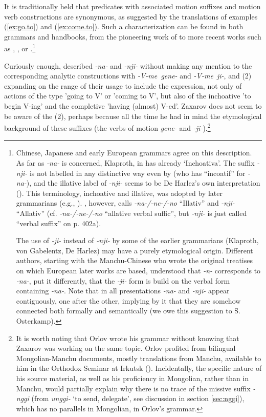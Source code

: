 \documentclass{article}
\newcommand{\ipa}[1]{\textit{{\phon\mbox{#1}}}} %
\begin{document}
It is traditionally held that predicates with associated motion suffixes and motion verb constructions are synonymous, as suggested by the translations of examples (\ref{ex:go.to}) and (\ref{ex:come.to}). Such a characterization can be found in both grammars and handbooks, from the pioneering work of \citet[163-165 §§133-134]{zaxarov10manchu} to more recent works such as \citet[34-35]{pashkov63manchu}, \citet[173-174]{avrorin00manchu},  \citet[19]{li00manchu} or \citet[239-240]{gorelova02manchu}.\footnote{Chinese, Japanese and early European grammars agree on this description. As far as \ipa{-na-} is concerned, Klaproth, in \citet[206]{adelung1817mithr} has already `Inchoativa'. The suffix \ipa{-nji-} is not labelled in any distinctive way even by \citet[51]{gabelentz32mandchou} (who has “incoatif” for \ipa{-na-}), and the illative label of \ipa{-nji-} seems to be De Harlez’s own interpretation (\citealt[51]{harlez84mandchou}). This terminology, inchoative and illative, was adopted by later grammarians  (e.g., \citet[367]{peeters40manjurische}). \citet[53]{haenisch61mandschu}, however, calls \ipa{-na-/-ne-/-no} “Illativ” and \ipa{-nji-} “Allativ” (cf. \citet[401b]{li00manchu} \ipa{-na-/-ne-/-no} “allative verbal suffic”, but \ipa{-nji-} is just called “verbal suffix” on p. 402a).

The use of \ipa{-ji-} instead of \ipa{-nji-} by some of the earlier grammarians (Klaproth, von Gabelentz, De Harlez) may have a purely etymological origin. Different authors, starting with the Manchu-Chinese who wrote the original treatises on which European later works are based, understood that \ipa{-n-} corresponds to \ipa{-na-}, put it differently, that the \ipa{-ji-} form is build on the verbal form containing \ipa{-na-}. Note that in all presentations \ipa{-na-} and \ipa{-nji-} appear contiguously, one after the other, implying by it that they are somehow connected both formally and semantically (we owe this suggestion to S. Osterkamp).}

Curiously enough, \citet{orlov1873manchu} described \ipa{-na-} and \ipa{-nji-} without making any mention to the corresponding analytic constructions with \ipa{-V-me gene-} and \ipa{-V-me ji-}, and (2) expanding on the range of their usage to include the expression, not only of actions of the type 'going to V' or 'coming to V', but also of the inchoative 'to begin V-ing' and the completive 'having (almost) V-ed'. Zaxarov does not seem to be aware of the (2), perhaps because all the time he had in mind the etymological background of these suffixes (the verbs of motion  \ipa{gene-} and \ipa{-ji-}).\footnote{It is worth noting that Orlov wrote his grammar without knowing that Zaxarov was working on the same topic. Orlov profited from bilingual Mongolian-Manchu documents, mostly translations from Manchu, available to him in the Orthodox Seminar at Irkutsk (\citealt[V]{orlov1873manchu}). Incidentally, the specific nature of his source material, as well as his proficiency in Mongolian, rather than in Manchu, would partially explain why there is no trace of the missive suffix \ipa{-nggi} (from \ipa{unggi-} ‘to send, delegate’, see discussion in section \ref{sec:nggi}), which has no parallels in Mongolian, in Orlov’s grammar.}
\end{document}
